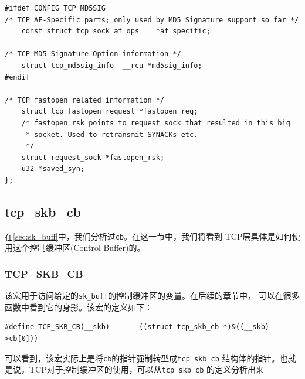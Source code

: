 \documentclass[11pt, a4paper,oneside]{book}
\theoremstyle{ocrenumbox}
\theoremstyle{purplenumbox}
\theoremstyle{blackbox}
\begin{document}
\begin{verbatim}
#ifdef CONFIG_TCP_MD5SIG
/* TCP AF-Specific parts; only used by MD5 Signature support so far */
	const struct tcp_sock_af_ops	*af_specific;

/* TCP MD5 Signature Option information */
	struct tcp_md5sig_info	__rcu *md5sig_info;
#endif

/* TCP fastopen related information */
	struct tcp_fastopen_request *fastopen_req;
	/* fastopen_rsk points to request_sock that resulted in this big
	 * socket. Used to retransmit SYNACKs etc.
	 */
	struct request_sock *fastopen_rsk;
	u32	*saved_syn;
};

\end{verbatim}
		\subsection{tcp\_skb\_cb}
\label{sec:tcp_skb_cb}

在\ref{sec:sk_buff}中，我们分析过\texttt{cb}。在这一节中，我们将看到
TCP层具体是如何使用这个控制缓冲区(Control Buffer)的。

			\subsubsection{TCP\_SKB\_CB}
\label{subsec:tcp_skb_cb}

该宏用于访问给定的\texttt{sk_buff}的控制缓冲区的变量。在后续的章节中，
可以在很多函数中看到它的身影。该宏的定义如下：

\begin{verbatim}
#define TCP_SKB_CB(__skb)       ((struct tcp_skb_cb *)&((__skb)->cb[0]))
\end{verbatim}

可以看到，该宏实际上是将\texttt{cb}的指针强制转型成\texttt{tcp_skb_cb}
结构体的指针。也就是说，TCP对于控制缓冲区的使用，可以从\texttt{tcp_skb_cb}
的定义分析出来
\end{document}
